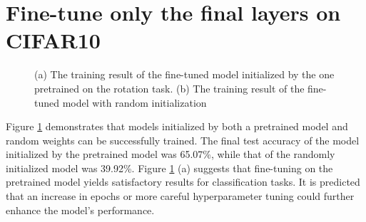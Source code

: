 \documentclass[10pt]{article}
\begin{document}
\section{Fine-tune only the final layers on CIFAR10 \label{sec2}}
\begin{figure}[!h]
    \begin{center}
    \end{center}
    \caption{(a) The training result of the fine-tuned model initialized by the one pretrained on the rotation task. (b) The training result of the fine-tuned model with random initialization}
    \label{fig2}
\end{figure}
Figure \ref{fig2} demonstrates that models initialized by both a pretrained model and random weights can be successfully trained. The final test accuracy of the model initialized by the pretrained model was 65.07\%, while that of the randomly initialized model was 39.92\%. Figure \ref{fig2} (a) suggests that fine-tuning on the pretrained model yields satisfactory results for classification tasks. It is predicted that an increase in epochs or more careful hyperparameter tuning could further enhance the model's performance.
\end{document}
